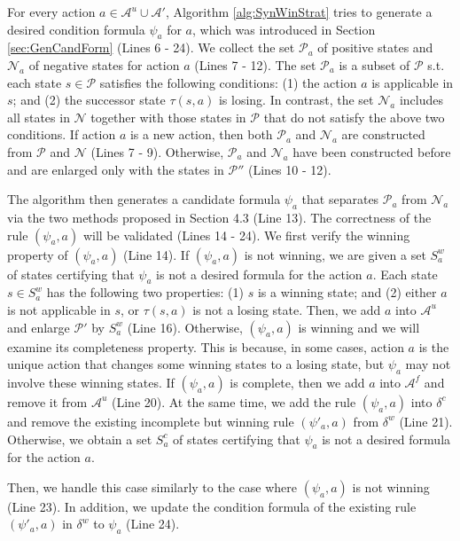 \documentclass[review]{elsarticle}
\newcommand{\positiveSet}{\mathcal{P}}
\newcommand{\negativeSet}{\mathcal{N}}
\newcommand{\act}{\mathcal{A}}
\newcommand{\suc}{\tau}
\begin{document}
For every action $a \in \act^u \cup \act'$, Algorithm \ref{alg:SynWinStrat} tries to generate a desired condition formula $\psi_a$ for $a$, which was introduced in Section \ref{sec:GenCandForm} (Lines 6 - 24).
We collect the set $\positiveSet_a$ of positive states and $\negativeSet_a$ of negative states for action $a$ (Lines 7 - 12).
The set $\positiveSet_a$ is a subset of $\positiveSet$ s.t. each state $s \in \positiveSet$ satisfies the following conditions: (1) the action $a$ is applicable in $s$; and
(2) the successor state $\suc(s, a)$ is losing.
In contrast, the set $\negativeSet_a$ includes all states in $\negativeSet$ together with those states in $\positiveSet$ that do not satisfy the above two conditions.
If action $a$ is a new action, then both $\positiveSet_a$ and $\negativeSet_a$ are constructed from $\positiveSet$ and $\negativeSet$ (Lines 7 - 9).
Otherwise, $\positiveSet_a$ and $\negativeSet_a$ have been constructed before and are enlarged only with the states in $\positiveSet''$ (Lines 10 - 12).


The algorithm then generates a candidate formula $\psi_a$ that separates $\positiveSet_a$ from $\negativeSet_a$ via the two methods proposed in Section 4.3 (Line 13).
The correctness of the rule $(\psi_a, a)$ will be validated (Lines 14 - 24).
We first verify the winning property of $(\psi_a, a)$ (Line 14).
If $(\psi_a, a)$ is not winning, we are given a set $S^w_a$ of states certifying that $\psi_a$ is not a desired formula for the action $a$.
Each state $s \in S^w_a$ has the following two properties:
(1) $s$ is a winning state; and
(2) either $a$ is not applicable in $s$, or $\suc(s, a)$ is not a losing state.
Then, we add $a$ into $\act^u$ and enlarge $\positiveSet'$ by $S^w_a$ (Line 16).
Otherwise, $(\psi_a, a)$ is winning and we will examine its completeness property.
This is because, in some cases, action $a$ is the unique action that changes some winning states to a losing state, but $\psi_a$ may not involve these winning states.
If $(\psi_a, a)$ is complete, then we add $a$ into $\act^f$ and remove it from $\act^u$ (Line 20).
At the same time, we add the rule $(\psi_a, a)$ into $\delta^c$ and remove the existing incomplete but winning rule $(\psi'_a, a)$ from $\delta^w$ (Line 21).
Otherwise, we obtain a set $S^c_a$ of states certifying that $\psi_a$ is not a desired formula for the action $a$.


Then, we handle this case similarly to the case where $(\psi_a, a)$ is not winning (Line 23).
In addition, we update the condition formula of the existing rule $(\psi'_a, a)$ in $\delta^w$ to $\psi_a$ (Line 24).
\end{document}
